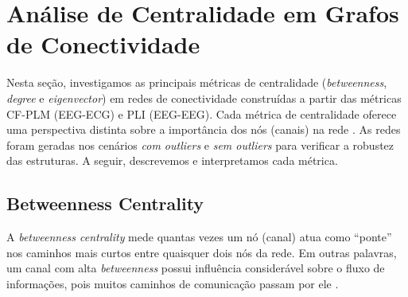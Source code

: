 \section{Análise de Centralidade em Grafos de Conectividade}
\label{sec:analise_centralidade}

Nesta seção, investigamos as principais métricas de centralidade (\emph{betweenness}, \emph{degree} e \emph{eigenvector}) em redes de conectividade construídas a partir das métricas CF-PLM (EEG-ECG) e PLI (EEG-EEG). Cada métrica de centralidade oferece uma perspectiva distinta sobre a importância dos nós (canais) na rede \cite{rubinov2010complex, bullmore2009complex}. As redes foram geradas nos cenários \emph{com outliers} e \emph{sem outliers} para verificar a robustez das estruturas. A seguir, descrevemos e interpretamos cada métrica.

\subsection{Betweenness Centrality}
A \emph{betweenness centrality} mede quantas vezes um nó (canal) atua como “ponte” nos caminhos mais curtos entre quaisquer dois nós da rede. Em outras palavras, um canal com alta \emph{betweenness} possui influência considerável sobre o fluxo de informações, pois muitos caminhos de comunicação passam por ele \cite{freeman1977set}.

